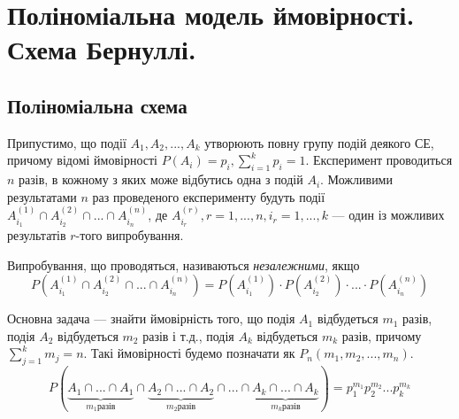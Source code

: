 
\section{Поліноміальна модель ймовірності. Схема Бернуллі.}
\subsection{Поліноміальна схема}
Припустимо, що події $A_1, A_2, ..., A_k$ утворюють повну групу подій деякого 
СЕ, причому відомі ймовірності $P(A_i) = p_i, \sum_{i=1}^k p_i = 1$.
Експеримент проводиться $n$ разів, в кожному з яких може відбутись одна з 
подій $A_i$. Можливими результатами $n$ раз проведеного експерименту будуть події
$A_{i_1}^{(1)} \cap A_{i_2}^{(2)} \cap ... \cap A_{i_n}^{(n)}$,
де $A_{i_r}^{(r)}, r = 1,...,n, i_r = 1, ..., k$ --- один із можливих результатів $r$-того випробування.
\begin{definition}
    Випробування, що проводяться, називаються \emph{незалежними}, якщо 
    $$P\left(A_{i_1}^{(1)} \cap A_{i_2}^{(2)} \cap ... \cap A_{i_n}^{(n)}\right) = 
    P\left(A_{i_1}^{(1)}\right) \cdot P\left(A_{i_2}^{(2)}\right) \cdot ... \cdot P\left(A_{i_n}^{(n)}\right)$$
\end{definition}

Основна задача --- знайти ймовірність того, що подія $A_1$ відбудеться $m_1$ разів, 
подія $A_2$ відбудеться $m_2$ разів і т.д., подія $A_k$ відбудеться $m_k$ разів, причому $\sum_{j=1}^k m_j = n$. Такі ймовірності будемо позначати як $P_n(m_1, m_2, ..., m_n)$.
$$P\left(\underbrace{A_1 \cap ... \cap A_1}_{m_1 \text{разів}} 
\cap \underbrace{ A_2 \cap ... \cap A_2}_{m_2 \text{разів}}
\cap ... \cap  \underbrace{A_k \cap ... \cap A_k}_{m_k \text{разів}}\right)
= p_1^{m_1} p_2^{m_2} ... p_k^{m_k}$$

